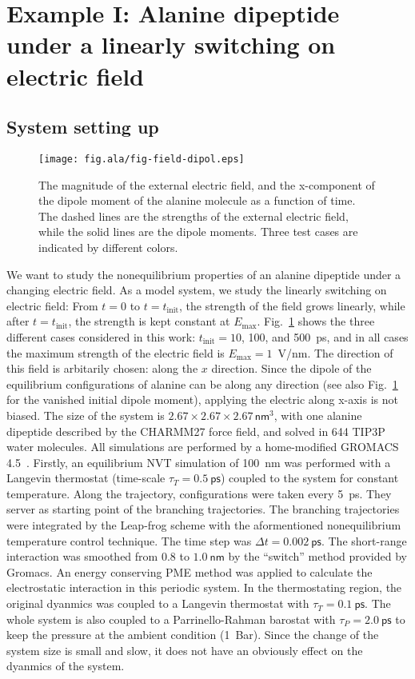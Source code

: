 \documentclass[aip,jcp,a4paper,preprint,onecolumn]{revtex4-1}
\begin{document}
\section{Example I: Alanine dipeptide
  under a linearly switching on electric field}

\subsection{System setting up }
\begin{figure}
  \centering
  \texttt{[image: fig.ala/fig-field-dipol.eps]}
  \caption{The magnitude of the external electric field, and the
    x-component of the dipole moment of the alanine molecule as a
    function of time. The dashed lines are the strengths of the
    external electric field, while the solid lines are the dipole
    moments. Three test cases are indicated by different colors.}
  \label{fig:tmp3}
\end{figure}

We want to study the nonequilibrium properties of an alanine dipeptide
under a changing electric field. As a model system, we study the
linearly switching on electric field: From $t=0$ to
$t=t_{\textrm{init}}$, the strength of the field grows linearly, while
after $t=t_{\textrm{init}}$, the strength is kept constant at
$E_{\textrm{max}}$. Fig.~\ref{fig:tmp3} shows the three different
cases considered in this work: $t_{\textrm{init}} = 10$, 100, and
500~ps, and 
in all cases the maximum strength of the electric field is
$E_{\textrm{max}} = 1$~V/nm.
The direction of this field is arbitarily chosen: along the
$x$ direction. Since the dipole of the equilibrium configurations of
alanine can be along any direction (see also Fig.~\ref{fig:tmp3} for
the vanished initial dipole moment), applying the electric along x-axis is
not biased.
The size of the system is $2.67\times 2.67\times
2.67\, \textsf{nm}^3$, with one alanine dipeptide described by the CHARMM27 force field, and solved in 644 TIP3P
water molecules.
All simulations are performed by a home-modified GROMACS 4.5~\cite{pronk2013gromacs}.
Firstly, an equilibrium NVT simulation of
100~\textsf{nm} was performed with a Langevin thermostat (time-scale
$\tau_T = 0.5~\textsf{ps}$) coupled to the system for constant
temperature.  Along the trajectory, configurations were taken every
5~\textsf{ps}.  They server as starting point of the branching
trajectories. The branching trajectories were integrated by the
Leap-frog scheme with the aformentioned nonequilibrium temperature control technique.  The
time step was $\Delta t = 0.002~\textsf{ps}$. The short-range
interaction was smoothed from $0.8$ to $1.0~\textsf{nm}$ by the
``switch'' method provided by Gromacs.  An energy conserving PME
method was applied to calculate the electrostatic interaction in this
periodic system. In the thermostating region, the original dyanmics was
coupled to a Langevin thermostat with $\tau_T = 0.1~\textsf{ps}$.
The whole system is also coupled to a Parrinello-Rahman barostat with $\tau_P = 2.0~\textsf{ps}$ to keep
the pressure at the ambient condition (1~Bar). Since the
change of the system size is small and slow, it does not have an obviously effect on the
dyanmics of the system.
\end{document}
